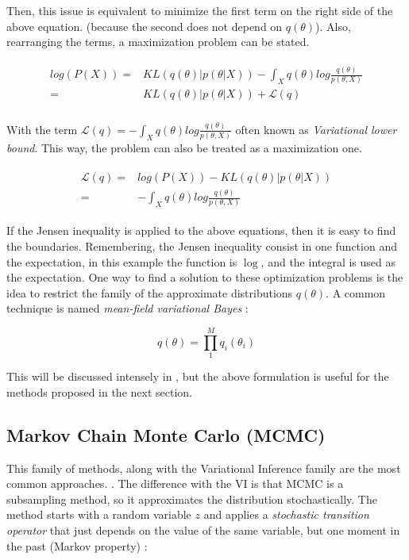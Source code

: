\documentclass{article}
\begin{document}
Then, this issue is equivalent to minimize the first term on the right side of the above equation. (because the second does not depend on $q(\theta)$). Also, rearranging the terms, a maximization problem can be stated.

\begin{align}
\begin{split}
log(P(X)) =& KL(q(\theta)|p(\theta|X)) - \int_{X} q(\theta) log \frac{q(\theta)}{p(\theta, X)} \\
          =& KL(q(\theta)|p(\theta|X)) + \mathcal{L}(q) \\
\end{split}
\end{align}

With the term $\mathcal{L}(q) =-\int_{X} q(\theta) log \frac{q(\theta)}{p(\theta, X)}$ often known as \textit{Variational lower bound}. This way, the problem can also be treated as a maximization one.

\begin{align}
\begin{split}
\mathcal{L}(q) =& log(P(X)) - KL(q(\theta)|p(\theta|X)) \\
=& -\int_{X} q(\theta) log \frac{q(\theta)}{p(\theta, X)}
\end{split}
\end{align}

If the Jensen inequality is applied to the above equations, then it is easy to find the boundaries. Remembering, the Jensen inequality consist in one function and the expectation, in this example the function is $\log$, and the integral is used as the expectation. One way to find a solution to these optimization problems is the idea to restrict the family of the approximate distributions $q(\theta)$. A common technique is named \textit{mean-field variational Bayes} \cite{bishop2006pattern}:

\begin{equation}
q(\theta) = \prod_{1}^{M} q_i(\theta_i)
\end{equation}

This will be discussed intensely in \cite{bishop2006pattern}, but the above formulation is useful for the methods proposed in the next section.

\subsection{Markov Chain Monte Carlo (MCMC)}

This family of methods, along with the Variational Inference family are the most common approaches. \cite{salimans2015markov}. The difference with the VI is that MCMC is a subsampling method, so it approximates the distribution stochastically. The method starts with a random variable $z$ and applies a \textit{stochastic transition operator} that just depends on the value of the same variable, but one moment in the past (Markov property) \cite{salimans2015markov}:
\end{document}
